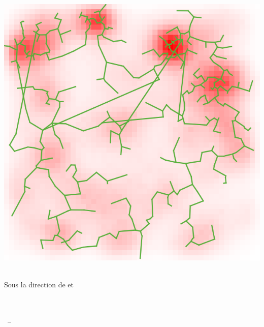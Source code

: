 
\begin{titlepage}

\begin{addmargin}[-1cm]{-3cm}
\begin{center}
\large

\hfill
\vfill

\begingroup
\color{Maroon}\spacedallcaps{\myTitle} \\ \bigskip %
\endgroup

\spacedlowsmallcaps{\myName} %

\vfill

\includegraphics[width=\textwidth]{Figures/Cover/cover} \\ \vspace{3cm} %

\mySubtitle \\ \medskip %
Sous la direction de \myProf et \myOtherProf \\ \medskip
\myDepartment \\  \medskip
\myFaculty \\  \bigskip

\myTime\ -- \myVersion %

\vfill

\end{center}
\end{addmargin}

\end{titlepage}
